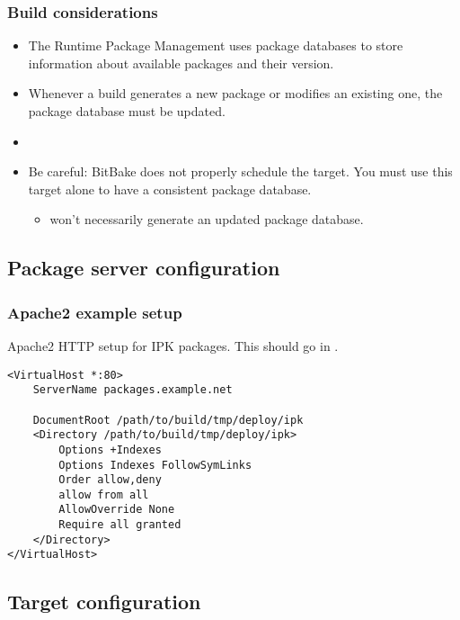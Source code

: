 \begin{frame}
  \frametitle{Build considerations}
  \begin{itemize}
    \item The Runtime Package Management uses package databases to
      store information about available packages and their version.
    \item Whenever a build generates a new package or modifies an
      existing one, the package database must be updated.
    \item {}
    \item Be careful: BitBake does not properly schedule the
       target. You must use this target alone to
      have a consistent package database.
      \begin{itemize}
        \item {} won't
          necessarily generate an updated package database.
      \end{itemize}
  \end{itemize}
\end{frame}

\subsection{Package server configuration}

\begin{frame}[fragile]
  \frametitle{Apache2 example setup}
  Apache2 HTTP setup for IPK packages. This should go in
  .
  \begin{block}{}
    \begin{verbatim}
<VirtualHost *:80>
    ServerName packages.example.net

    DocumentRoot /path/to/build/tmp/deploy/ipk
    <Directory /path/to/build/tmp/deploy/ipk>
        Options +Indexes
        Options Indexes FollowSymLinks
        Order allow,deny
        allow from all
        AllowOverride None
        Require all granted
    </Directory>
</VirtualHost>
    \end{verbatim}
  \end{block}
\end{frame}

\subsection{Target configuration}

